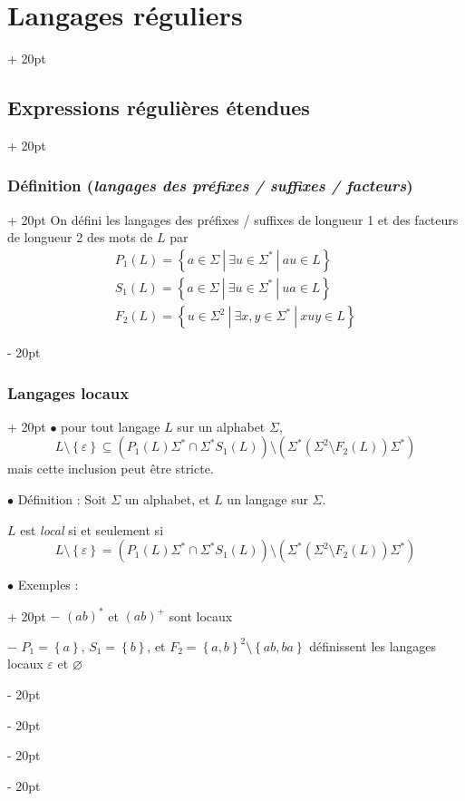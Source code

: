 \documentclass[a4paper, 12pt, twoside]{article}
\newcommand{\lr}[1]{\left( #1 \right)}
\newcommand{\set}[1]{\left\{ #1 \right\}}
\newcommand{\ind}[1][20pt]{\advance\leftskip + #1}
\newcommand{\deind}[1][20pt]{\advance\leftskip - #1}
\newenvironment{indt}[2][20pt]{#2 \par \ind[#1]}{\par \deind} %
\begin{document}
\begin{indt}{\section{Langages réguliers}}
\begin{indt}{\subsection{Expressions régulières étendues}}
\begin{indt}{\subsubsection{Définition (\textit{langages des préfixes / suffixes / facteurs})}}
                On défini les langages des préfixes / suffixes de longueur 1 et des facteurs de longueur 2 des mots de $L$ par
                \[
                    \begin{array}{l}
                        P_1(L) = \set{a \in \Sigma\ |\ \exists u \in \Sigma^*\ |\ au \in L}
                        \\
                        S_1(L) = \set{a \in \Sigma\ |\ \exists u \in \Sigma^*\ |\ ua \in L}
                        \\
                        F_2(L) = \set{u \in \Sigma^2\ |\ \exists x, y \in \Sigma^*\ |\ xuy \in L}
                    \end{array}
                \]
            \end{indt}

            \vspace{12pt}
            
            \begin{indt}{\subsubsection{Langages locaux}}
                $\bullet$  pour tout langage $L$ sur un alphabet $\Sigma$,
                \[
                    L \setminus \set \varepsilon
                    \subseteq
                    \lr{P_1(L) \Sigma^* \cap \Sigma^* S_1(L)} \setminus \lr{\Sigma^*\lr{\Sigma^2 \setminus F_2(L)} \Sigma^*}
                \]
                mais cette inclusion peut être stricte.

                \vspace{12pt}
                
                $\bullet$ Définition : Soit $\Sigma$ un alphabet, et $L$ un langage sur $\Sigma$.

                $L$ est \emph{local} si et seulement si
                \[
                    L \setminus \set \varepsilon = \lr{P_1(L) \Sigma^* \cap \Sigma^* S_1(L)} \setminus \lr{\Sigma^*\lr{\Sigma^2 \setminus F_2(L)} \Sigma^*}
                \]

                \vspace{12pt}
                
                \begin{indt}{$\bullet$ Exemples :}
                    $-$ $(ab)^*$ et $(ab)^+$ sont locaux

                    $-$ $P_1 = \set a$, $S_1 = \set b$, et $F_2 = \set{a, b}^2 \setminus \set{ab, ba}$ définissent les langages locaux $\varepsilon$ et $\varnothing$
                \end{indt}


\end{indt}
\end{indt}
\end{indt}
\end{document}
